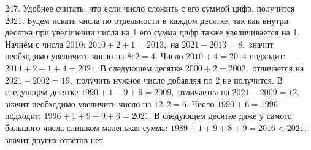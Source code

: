 247. Удобнее считать, что если число сложить с его суммой цифр, получится 2021. Будем искать числа по отдельности в каждом десятке, так как внутри десятка при увеличении числа на 1 его сумма цифр также увеличивается на 1. Начнём с числа 2010: $2010+2+1=2013,$ на $2021-2013=8,$ значит необходимо увеличить число на $8:2=4.$ Число $2010+4=2014$ подходит: $2014+2+1+4=2021.$ В следующем десятке $2000+2=2002,$ отличается на $2021-2002=19,$ получить нужное число добавляя по 2 не получится. В следующем десятке $1990+1+9+9=2009,$ отличается на $2021-2009=12,$ значит необходимо увеличить число на $12:2=6.$ Число $1990+6=1996$ подходит: $1996+1+9+9+6=2021.$ В следующем десятке даже у самого большого числа слишком маленькая сумма: $1989+1+9+8+9=2016<2021,$ значит других ответов нет.\\

